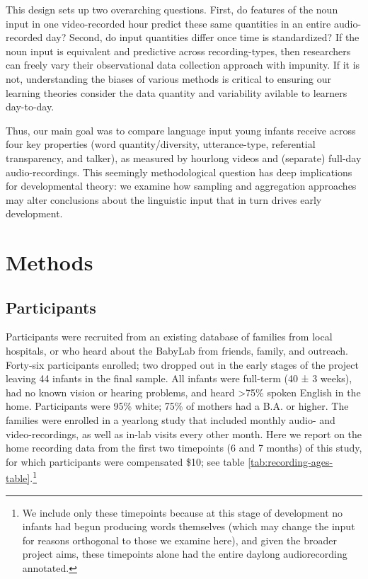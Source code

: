 \documentclass[floatsintext,man]{apa6}
\theoremstyle{definition}
\theoremstyle{definition}
\theoremstyle{definition}
\theoremstyle{remark}
\begin{document}
This design sets up two overarching questions. First, do features of the
noun input in one video-recorded hour predict these same quantities in
an entire audio-recorded day? Second, do input quantities differ once
time is standardized? If the noun input is equivalent and predictive
across recording-types, then researchers can freely vary their
observational data collection approach with impunity. If it is not,
understanding the biases of various methods is critical to ensuring our
learning theories consider the data quantity and variability avilable to
learners day-to-day.

Thus, our main goal was to compare language input young infants receive
across four key properties (word quantity/diversity, utterance-type,
referential transparency, and talker), as measured by hourlong videos
and (separate) full-day audio-recordings. This seemingly methodological
question has deep implications for developmental theory: we examine how
sampling and aggregation approaches may alter conclusions about the
linguistic input that in turn drives early development.

\hypertarget{methods}{%
\section{Methods}\label{methods}}

\hypertarget{participants}{%
\subsection{Participants}\label{participants}}

Participants were recruited from an existing database of families from
local hospitals, or who heard about the BabyLab from friends, family,
and outreach. Forty-six participants enrolled; two dropped out in the
early stages of the project leaving 44 infants in the final sample. All
infants were full-term (40 ± 3 weeks), had no known vision or hearing
problems, and heard \textgreater{}75\% spoken English in the home.
Participants were 95\% white; 75\% of mothers had a B.A. or higher. The
families were enrolled in a yearlong study that included monthly audio-
and video-recordings, as well as in-lab visits every other month. Here
we report on the home recording data from the first two timepoints (6
and 7 months) of this study, for which participants were compensated
\$10; see table
\ref{tab:recording-ages-table}.\footnote{We include only these timepoints because at this stage of development no infants had begun producing words themselves (which may change the input for reasons orthogonal to those we examine here), and given the broader project aims, these timepoints alone had the entire daylong audiorecording annotated.}
\end{document}
